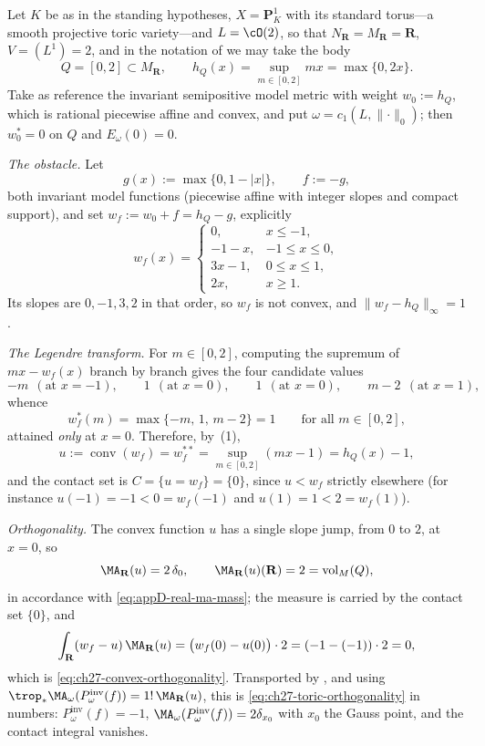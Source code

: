 \begin{example}
\label{ex:ch27-toric-legendre}
Let \(K\) be as in the standing hypotheses, \(X=\mathbf P^1_K\)
with its standard torus---a smooth projective toric variety---and
\(L=\cO(2)\), so that
\(N_{\mathbf R}=M_{\mathbf R}=\mathbf R\), \(V=(L^1)=2\), and in the
notation of  we may take the body
\[
 Q=[0,2]\subset M_{\mathbf R},
 \qquad
 h_Q(x)=\sup_{m\in[0,2]}mx=\max\{0,2x\} .
\]
Take as reference the invariant semipositive model metric with weight
\(w_0:=h_Q\), which is rational piecewise affine and convex, and put
\(\omega=c_1(L,\lVert\cdot\rVert_0)\); then
\(w_0^*=0\) on \(Q\) and \(E_\omega(0)=0\).

\emph{The obstacle.}  Let
\[
 g(x):=\max\{0,1-|x|\},
 \qquad
 f:=-g,
\]
both invariant model functions (piecewise affine with integer slopes and
compact support), and set \(w_f:=w_0+f=h_Q-g\), explicitly
\[
 w_f(x)=
 \begin{cases}
  0,&x\leq-1,\\
  -1-x,&-1\leq x\leq0,\\
  3x-1,&0\leq x\leq1,\\
  2x,&x\geq1 .
 \end{cases}
\]
Its slopes are \(0,-1,3,2\) in that order, so \(w_f\) is not convex, and
\(\lVert w_f-h_Q\rVert_\infty=1\).

\emph{The Legendre transform.}  For \(m\in[0,2]\), computing the supremum of
\(mx-w_f(x)\) branch by branch gives the four candidate values
\[
 -m\ \ (\text{at }x=-1),
 \qquad 1\ \ (\text{at }x=0),
 \qquad 1\ \ (\text{at }x=0),
 \qquad m-2\ \ (\text{at }x=1),
\]
whence
\[
 w_f^*(m)=\max\{-m,\,1,\,m-2\}=1
 \qquad\text{for all }m\in[0,2],
\]
attained \emph{only} at \(x=0\).  Therefore, by
\,(1),
\[
 u:=\operatorname{conv}(w_f)=w_f^{**}
   =\sup_{m\in[0,2]}(mx-1)=h_Q(x)-1,
\]
and the contact set is
\(C=\{u=w_f\}=\{0\}\), since \(u<w_f\) strictly elsewhere (for instance
\(u(-1)=-1<0=w_f(-1)\) and \(u(1)=1<2=w_f(1)\)).

\emph{Orthogonality.}  The convex function \(u\) has a single slope jump,
from \(0\) to \(2\), at \(x=0\), so
\[
 \MA_{\mathbf R}(u)=2\,\delta_0,
 \qquad
 \MA_{\mathbf R}(u)(\mathbf R)=2=\operatorname{vol}_M(Q),
\]
in accordance with \eqref{eq:appD-real-ma-mass}; the measure is carried by
the contact set \(\{0\}\), and
\[
 \int_{\mathbf R}(w_f-u)\,\MA_{\mathbf R}(u)
 =\bigl(w_f(0)-u(0)\bigr)\cdot2=(-1-(-1))\cdot2=0,
\]
which is \eqref{eq:ch27-convex-orthogonality}.  Transported by
, and using
\(\trop_*\MA_\omega(P^{\mathrm{inv}}_\omega(f))=1!\,\MA_{\mathbf R}(u)\), this
is \eqref{eq:ch27-toric-orthogonality} in numbers:
\(P^{\mathrm{inv}}_\omega(f)=-1\), \(\MA_\omega(P^{\mathrm{inv}}_\omega(f))=
2\delta_{x_0}\) with \(x_0\) the Gauss point, and the contact integral
vanishes.


\end{example}

